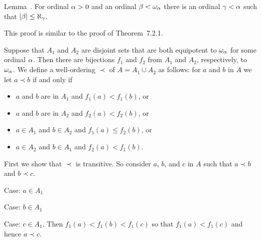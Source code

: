 \begin{solution}
    \begin{statement}{Lemma~\ex.}
        For ordinal $\alpha > 0$ and an ordinal $\beta < \omega_\alpha$ there is an ordinal $\gamma < \alpha$ such that $\left| \beta \right| \leq \aleph_\gamma$.
    \end{statement}

    \mainprob

    This proof is similar to the proof of Theorem~7.2.1.

	Suppose that $A_1$ and $A_2$ are disjoint sets that are both equipotent to $\omega_\alpha$ for some ordinal $\alpha$.
    Then there are bijections $f_1$ and $f_2$ from $A_1$ and $A_2$, respectively, to $\omega_\alpha$.
    We define a well-ordering $\prec$ of $A = A_1 \cup A_2$ as follows: for $a$ and $b$ in $A$ we let $a \prec b$ if and only if
    \begin{itemize}
        \item $a$ and $b$ are in $A_1$ and $f_1(a) < f_1(b)$, or
        \item $a$ and $b$ are in $A_2$ and $f_2(a) < f_2(b)$, or
        \item $a \in A_1$ and $b \in A_2$ and $f_1(a) \leq f_2(b)$, or
        \item $a \in A_2$ and $b \in A_1$ and $f_2(a) < f_1(b)$.
    \end{itemize}

    First we show that $\prec$ is transitive.
    So consider $a$, $b$, and $c$ in $A$ such that $a \prec b$ and $b \prec c$.

    Case: $a \in A_1$
    \begin{indpar}
        Case: $b \in A_1$
        \begin{indpar}
            Case: $c \in A_1$.
            Then $f_1(a) < f_1(b) < f_1(c)$ so that $f_1(a) < f_1(c)$ and hence $a \prec c$.


\end{indpar}
\end{indpar}
\end{solution}
